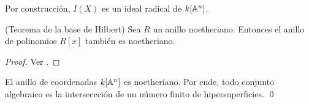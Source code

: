 \begin{remark}
Por construcción, $I(X)$ es un ideal radical de $k[\mathbb A^n]$.
\end{remark}

\begin{theorem}
(Teorema de la base de Hilbert) Sea $R$ un anillo noetheriano. Entonces el anillo de polinomios $R[x]$ también es noetheriano.
\end{theorem}

\begin{proof}
Ver \cite[pp. 13-14]{fulton}.
\end{proof}

\begin{corollary}
El anillo de coordenadas $k[\mathbb A^n]$ es noetheriano. Por ende, todo conjunto algebraico es la interseccción de un número finito de hipersuperficies. \qed
\end{corollary}

